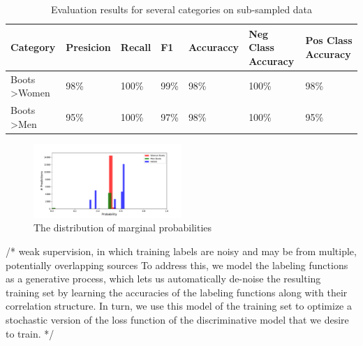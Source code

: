 \begin{table}
  \caption{Evaluation results for several categories on sub-sampled data}
  \label{tab:evaluation}
  \begin{tabular}{lllllll}
    \toprule
    Category & Presicion & Recall & F1 & Accuraccy & Neg Class Accuracy & Pos Class Accuracy\\
    \midrule 
    Boots \textgreater Women	& 98\% & 100\% & 99\% & 98\% & 100\% & 98\% \\
    Boots \textgreater Men &	95\%	& 100\% & 97\% & 98\% & 100\% & 95\% \\
    \bottomrule
  \end{tabular}
\end{table}
\begin{figure}[th]
   \includegraphics[width=0.5\textwidth]{resources/genmodel_pred_probs}
   \caption{The distribution of marginal probabilities}
   \label{fig:genmodel_pred_probs}
   \centering
\end{figure}


/*
weak supervision, in which training labels are noisy and may be from
multiple, potentially overlapping sources
To address this, we model the labeling functions as a generative
process, which lets us automatically de-noise the resulting training set by learning the accuracies of
the labeling functions along with their correlation structure. In turn, we use this model of the training
set to optimize a stochastic version of the loss function of the discriminative model that we desire to train. 
*/